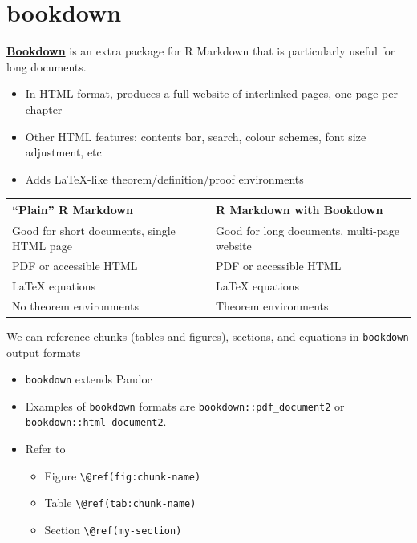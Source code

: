 \documentclass[
  a4paper,
  twoside,
  openright]{book}
\providecommand{\tightlist}{%
  \setlength{\itemsep}{0pt}\setlength{\parskip}{0pt}}
\theoremstyle{definition}
\theoremstyle{definition}
\theoremstyle{definition}
\theoremstyle{definition}
\theoremstyle{remark}
\begin{document}
\chapter{bookdown}\label{bookdown}

\textbf{\href{https://bookdown.org/yihui/rmarkdown/bookdown-start.html}{Bookdown}} is an extra package for R Markdown that is particularly useful for long documents.

\begin{itemize}
\tightlist
\item
  In HTML format, produces a full website of interlinked pages, one page per chapter
\item
  Other HTML features: contents bar, search, colour schemes, font size adjustment, etc
\item
  Adds LaTeX-like theorem/definition/proof environments
\end{itemize}

\begin{longtable}[]{@{}
  >{\raggedright\arraybackslash}p{}
  >{\raggedright\arraybackslash}p{}@{}}
\toprule\noalign{}
\begin{minipage}[b]{\linewidth}\raggedright
``Plain'' R Markdown
\end{minipage} & \begin{minipage}[b]{\linewidth}\raggedright
R Markdown with Bookdown
\end{minipage} \\
\midrule\noalign{}
\endhead
\bottomrule\noalign{}
\endlastfoot
Good for short documents, single HTML page & Good for long documents, multi-page website \\
PDF or accessible HTML & PDF or accessible HTML \\
LaTeX equations & LaTeX equations \\
No theorem environments & Theorem environments \\
\end{longtable}

We can reference chunks (tables and figures), sections, and equations in \texttt{bookdown} output formats

\begin{itemize}
\tightlist
\item
  \texttt{bookdown} extends Pandoc
\item
  Examples of \texttt{bookdown} formats are \texttt{bookdown::pdf\_document2} or \texttt{bookdown::html\_document2}.
\item
  Refer to

  \begin{itemize}
  \tightlist
  \item
    Figure \texttt{\textbackslash{}@ref(fig:chunk-name)}
  \item
    Table \texttt{\textbackslash{}@ref(tab:chunk-name)}
  \item
    Section \texttt{\textbackslash{}@ref(my-section)}
  \end{itemize}
\end{itemize}
\end{document}
